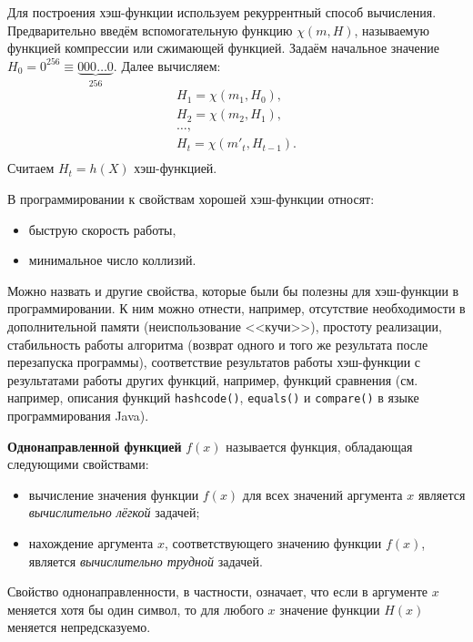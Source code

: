 Для построения хэш-функции используем рекуррентный способ вычисления. Предварительно введём вспомогательную функцию $\chi(m, H)$, называемую функцией компрессии или сжимающей функцией. Задаём начальное значение $H_{0} = 0^{256} \equiv \underbrace{000 \ldots 0}_{256} $. Далее вычисляем:
\[ \begin{array}{l}
    H_1 = \chi( m_1, H_0), \\
    H_2 = \chi( m_2, H_1), \\
    \dots,\\
    H_t = \chi( m'_t, H_{t-1}). \\
\end{array} \]
Считаем $H_{t} = h(X)$ хэш-функцией.
\exampleend

В программировании к свойствам хорошей хэш-функции относят:
\begin{itemize}
    \item быструю скорость работы,
    \item минимальное число коллизий.
\end{itemize}

Можно назвать и другие свойства, которые были бы полезны для хэш-функции в программировании. К ним можно отнести, например, отсутствие необходимости в дополнительной памяти (неиспользование <<кучи>>), простоту реализации, стабильность работы алгоритма (возврат одного и того же результата после перезапуска программы), соответствие результатов работы хэш-функции с результатами работы других функций, например, функций сравнения (см. например, описания функций \texttt{hashcode()}, \texttt{equals()} и \texttt{compare()} в языке программирования Java).

\textbf{Однонаправленной функцией} $f(x)$ называется функция, обладающая следующими свойствами:
\begin{itemize}
    \item вычисление значения функции $f(x)$ для всех значений аргумента $x$ является \emph{вычислительно лёгкой} задачей;
    \item нахождение аргумента $x$, соответствующего значению функции $f(x)$, является \emph{вычислительно трудной} задачей.
\end{itemize}

Свойство однонаправленности, в частности, означает, что если в аргументе $x$ меняется хотя бы один символ, то для любого $x$ значение функции $H(x)$ меняется непредсказуемо.

